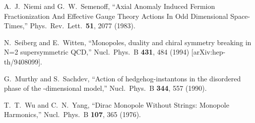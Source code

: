 \documentclass[a4paper,12pt, amsfonts, amssymb]{article}
\providecommand{\CC}{{\mathbb C}}
\providecommand{\PP}{{\mathbb P}}
\begin{document}
\begin{thebibliography}{99}
A.~J.~Niemi and G.~W.~Semenoff,
``Axial Anomaly Induced Fermion Fractionization And Effective Gauge Theory Actions In Odd Dimensional Space-Times,''
Phys.\ Rev.\ Lett.\  {\bf 51}, 2077 (1983).

N.~Seiberg and E.~Witten,
``Monopoles, duality and chiral symmetry breaking in N=2 
supersymmetric QCD,'' Nucl.\ Phys.\ B {\bf 431}, 484 (1994)
[arXiv:hep-th/9408099].

G.~Murthy and S.~Sachdev, ``Action of hedgehog-instantons in the disordered phase of the \coordHE{}-dimensional
\myHighlight{$\CC\PP^{N-1}$}\coordHE{} model,'' Nucl.\ Phys.\ B {\bf 344}, 557 (1990).

T.~T.~Wu and C.~N.~Yang, ``Dirac Monopole Without Strings: Monopole
Harmonics,'' Nucl.\ Phys.\ B {\bf 107}, 365 (1976).






\end{thebibliography}
\end{document}
